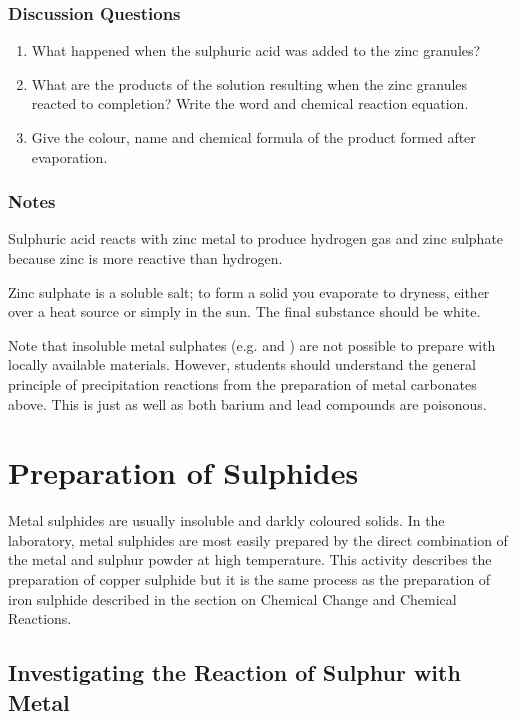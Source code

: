 \subsubsection*{Discussion Questions}
\begin{enumerate}
\item{What happened when the sulphuric acid was added to the zinc granules?}
\item{What are the products of the solution resulting when the zinc granules reacted to completion? Write the word and chemical reaction equation.}
\item{Give the colour, name and chemical formula of the product formed after evaporation.}
\end{enumerate}

\subsubsection*{Notes}
Sulphuric acid reacts with zinc metal to produce hydrogen gas and zinc sulphate because zinc is more reactive than hydrogen.


Zinc sulphate is a soluble salt; to form a solid you evaporate to dryness, either over a heat source or simply in the sun. The final substance should be white.

Note that insoluble metal sulphates (e.g.  and ) are not possible to prepare with locally available materials. However, students should understand the general principle of precipitation reactions from the preparation of metal carbonates above. This is just as well as both barium and lead compounds are poisonous.

\section{Preparation of Sulphides}

Metal sulphides are usually insoluble and darkly coloured solids. In the laboratory, metal sulphides are most easily prepared by the direct combination of the metal and sulphur powder at high temperature. This activity describes the preparation of copper sulphide but it is the same process as the preparation of iron sulphide described in the section on Chemical Change and Chemical Reactions.

\subsection{Investigating the Reaction of Sulphur with Metal}

